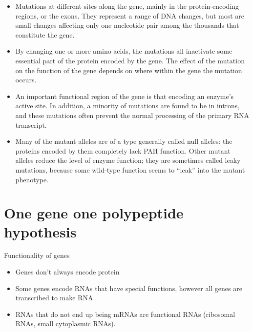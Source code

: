\documentclass[11pt,dvipsnames,ignorenonframetext,aspectratio=169]{beamer}
\providecommand{\tightlist}{%
  \setlength{\itemsep}{0pt}\setlength{\parskip}{0pt}}
\begin{document}
\begin{frame}{}
\protect\hypertarget{section-6}{}
\begin{itemize}
\tightlist
\item
  Mutations at different sites along the gene, mainly in the
  protein-encoding regions, or the exons. They represent a range of DNA
  changes, but most are small changes affecting only one nucleotide pair
  among the thousands that constitute the gene.
\item
  By changing one or more amino acids, the mutations all inactivate some
  essential part of the protein encoded by the gene. The effect of the
  mutation on the function of the gene depends on where within the gene
  the mutation occurs.
\end{itemize}
\end{frame}

\begin{frame}{}
\protect\hypertarget{section-7}{}
\begin{itemize}
\tightlist
\item
  An important functional region of the gene is that encoding an
  enzyme's active site. In addition, a minority of mutations are found
  to be in introns, and these mutations often prevent the normal
  processing of the primary RNA transcript.
\item
  Many of the mutant alleles are of a type generally called null
  alleles: the proteins encoded by them completely lack PAH function.
  Other mutant alleles reduce the level of enzyme function; they are
  sometimes called leaky mutations, because some wild-type function
  seems to ``leak'' into the mutant phenotype.
\end{itemize}
\end{frame}

\hypertarget{one-gene-one-polypeptide-hypothesis}{%
\section{One gene one polypeptide
hypothesis}\label{one-gene-one-polypeptide-hypothesis}}

\begin{frame}{Functionality of genes}
\protect\hypertarget{functionality-of-genes}{}
\begin{itemize}
\tightlist
\item
  Genes don't always encode protein
\item
  Some genes encode RNAs that have special functions, however all genes
  are transcribed to make RNA.
\item
  RNAs that do not end up being mRNAs are functional RNAs (ribosomal
  RNAs, small cytoplasmic RNAs).
\end{itemize}
\end{frame}
\end{document}

